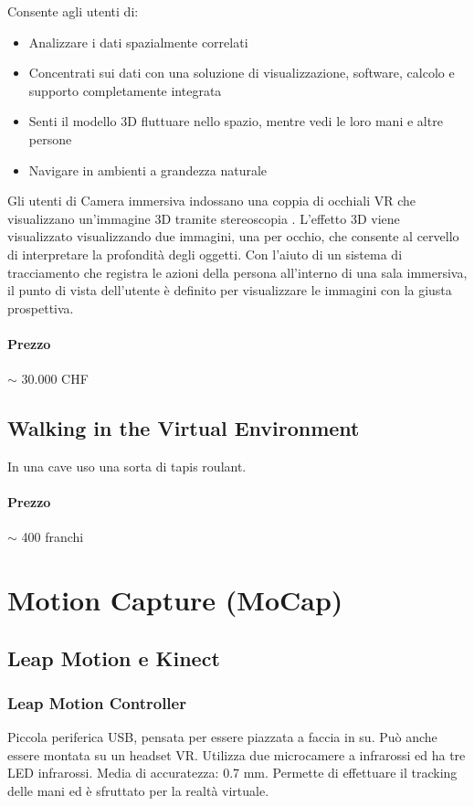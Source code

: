 \documentclass[8pt]{extarticle}
\begin{document}
\begin{multicols}{3}
Consente agli utenti di:
\begin{itemize}
    \item Analizzare i dati spazialmente correlati
    \item Concentrati sui dati con una soluzione di visualizzazione, software, calcolo e supporto completamente integrata
    \item Senti il modello 3D fluttuare nello spazio, mentre vedi le loro mani e altre persone
    \item Navigare in ambienti a grandezza naturale 
\end{itemize}
Gli utenti di Camera immersiva indossano una coppia di occhiali VR che visualizzano un'immagine 3D tramite stereoscopia . L'effetto 3D viene visualizzato visualizzando due immagini, una per occhio, che consente al cervello di interpretare la profondità degli oggetti. Con l'aiuto di un sistema di tracciamento che registra le azioni della persona all'interno di una sala immersiva, il punto di vista dell'utente è definito per visualizzare le immagini con la giusta prospettiva. 
\paragraph{Prezzo} $\sim$ 30.000 CHF

\subsection{Walking in the Virtual Environment}
In una cave uso una sorta di tapis roulant. 
\paragraph{Prezzo} $\sim$ 400 franchi

\section{Motion Capture (MoCap)}
\subsection{Leap Motion e Kinect}

\subsubsection{Leap Motion Controller}
Piccola periferica USB, pensata per essere piazzata a faccia in su. Può anche essere montata su un headset VR.
Utilizza due microcamere a infrarossi ed ha tre LED infrarossi. Media di accuratezza: 0.7 mm.
Permette di effettuare il tracking delle mani ed è sfruttato per la realtà virtuale.


\end{multicols}
\end{document}
